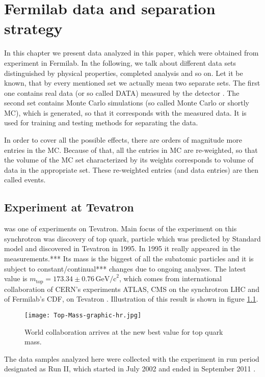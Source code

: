 \chapter{Fermilab data and separation strategy}

In this chapter we present data analyzed in this paper, which were obtained from experiment \dzero in Fermilab. In the following, we talk about different data sets distinguished by physical properties, completed analysis and so on. Let it be known, that by every mentioned set we actually mean two separate sets. The first one contains real data (or so called DATA) measured by the detector \dzero. The second set contains Monte Carlo simulations (so called Monte Carlo or shortly MC), which is generated, so that it corresponds with the measured data. It is used for training and testing methods for separating the data. 

In order to cover all the possible effects, there are orders of magnitude more entries in the MC. Because of that, all the entries in MC are re-weighted, so that the volume of the MC set characterized by its weights corresponds to volume of data in the appropriate set. These re-weighted entries (and data entries) are then called events.

\section{\texorpdfstring{\dzero}{D0} Experiment at Tevatron}
\dzero was one of experiments on Tevatron. Main focus of the \dzero experiment on this synchrotron was discovery of top quark, particle which was predicted by Standard model and discovered in Tevatron in 1995. 
In 1995 it really appeared in the \dzero measurements.***
Its mass is the biggest of all the subatomic particles and it is subject to constant/continual*** changes due to ongoing analyses. The latest value is $m_\mathrm{top} = 173.34 \pm 0.76 \,\mathrm{GeV/c}^2 $, which comes from international collaboration of CERN's experiments ATLAS, CMS on the synchrotron LHC and of Fermilab's CDF, \dzero on Tevatron \cite{jointMass}. Illustration of this result is shown in figure \ref{fig:jointMass}. 

\begin{figure}[h]
	\centering
	\texttt{[image: Top-Mass-graphic-hr.jpg]}
	\caption{World collaboration arrives at the new best value for top quark mass.}
	\label{fig:jointMass}
\end{figure}

The data samples analyzed here were collected with the \dzero experiment in run period designated as Run II, which started in July 2002 and ended in September 2011 \cite{Yuntse}.

